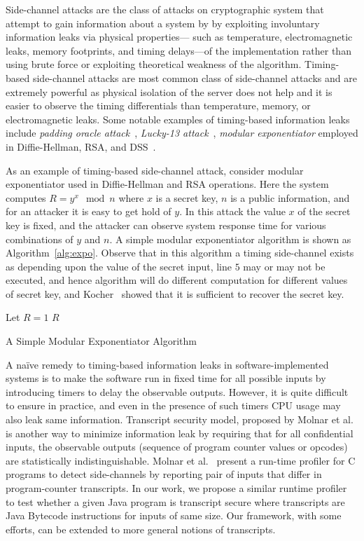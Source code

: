 Side-channel attacks are the class of attacks on cryptographic system that
attempt to gain information about a system by by exploiting involuntary
information leaks via physical properties---
such as temperature, electromagnetic leaks, memory footprints, and timing
delays---of the implementation rather than using brute force or exploiting
theoretical weakness of the algorithm.
Timing-based side-channel attacks are most common class of
side-channel attacks and are extremely powerful as physical isolation of the
server does not help and it is easier to observe the timing differentials than
temperature, memory, or electromagnetic leaks.  
Some notable examples of timing-based information leaks include \emph{padding oracle
attack}~\cite{Vau02}, \emph{Lucky-13 attack}~\cite{al2013lucky},  \emph{modular
exponentiator} employed in Diffie-Hellman, RSA, and DSS~\cite{kocher96}.

As an example of timing-based side-channel attack, consider modular
exponentiator used in Diffie-Hellman and RSA operations.
Here the system computes $R = y^x \mod n$ where $x$ is a secret key, $n$ is a
public information, and for an attacker it is easy to get hold of $y$.
In this attack the value $x$ of the secret key is fixed, and the attacker can
observe system response time for various combinations of $y$ and $n$.
A simple modular exponentiator algorithm is shown as Algorithm~\ref{alg:expo}.
Observe that in this algorithm a timing side-channel exists as depending upon
the value of the secret input, line $5$ may or may not be executed, and hence
algorithm will do different computation for different values of secret key, and
Kocher~\cite{kocher96} showed that it is sufficient to recover the secret key.
\begin{algorithm}[t]
Let $R = 1$\;
\Return $R$\;
\caption{A Simple Modular Exponentiator Algorithm}
\label{alg:expo}
\end{algorithm}

A na\"ive remedy to timing-based information leaks in software-implemented
systems is to make the software run in fixed time for all possible inputs by
introducing timers to delay the observable outputs. 
However, it is quite difficult to ensure in practice, and even in the presence
of such timers CPU usage may also leak same information.
Transcript security model, proposed by Molnar et al.~\cite{Molnar05} is another way
to minimize information leak by requiring that for all confidential inputs, the
observable outputs (sequence of program counter values or opcodes) are
statistically indistinguishable.
Molnar et al.~\cite{Molnar05} present a run-time profiler for C programs to
detect side-channels by reporting pair of inputs that differ in program-counter
transcripts.  
In our work, we propose a similar runtime profiler to test whether a given
Java program is transcript secure where transcripts are Java Bytecode
instructions for inputs of same size.
Our framework, with some efforts, can be extended to more general notions of
transcripts. 

